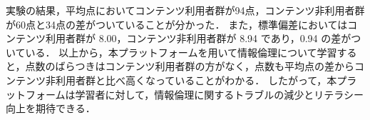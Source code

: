 実験の結果，平均点においてコンテンツ利用者群が94点，コンテンツ非利用者群が60点と34点の差がついていることが分かった．
また，標準偏差においてはコンテンツ利用者群が 8.00，コンテンツ非利用者群が 8.94 であり，0.94 の差がついている．
以上から，本プラットフォームを用いて情報倫理について学習すると，点数のばらつきはコンテンツ利用者群の方がなく，点数も平均点の差からコンテンツ非利用者群と比べ高くなっていることがわかる．
したがって，本プラットフォームは学習者に対して，情報倫理に関するトラブルの減少とリテラシー向上を期待できる．
